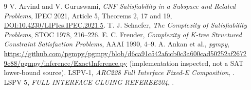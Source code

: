 \documentclass[11pt]{article}
\begin{document}
\begin{thebibliography}{9}
 V. Arvind and V. Guruswami, \emph{CNF Satisfiability in a Subspace and Related Problems}, IPEC 2021, Article 5, Theorems 2, 17 and 19, \href{https://doi.org/10.4230/LIPIcs.IPEC.2021.5}{DOI:10.4230/LIPIcs.IPEC.2021.5}.
 T. J. Schaefer, \emph{The Complexity of Satisfiability Problems}, STOC 1978, 216--226.
 E. C. Freuder, \emph{Complexity of K-tree Structured Constraint Satisfaction Problems}, AAAI 1990, 4--9.
 A. Ankan et al., \emph{pgmpy}, \url{https://github.com/pgmpy/pgmpy/blob/d6ca91c542afccb0c3a600cad50252af26729c88/pgmpy/inference/ExactInference.py} (implementation inspected, not a SAT lower-bound source).
 LSPV-1, \emph{ARC228 Full Interface Fixed-E Composition}, .
 LSPV-5, \emph{FULL-INTERFACE-GLUING-REFEREE204}, .
\end{thebibliography}
\end{document}
